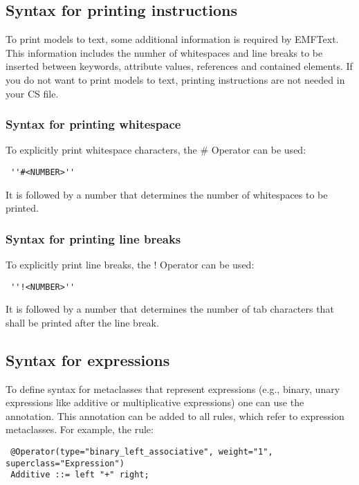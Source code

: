 \subsection{Syntax for printing instructions}

To print models to text, some additional information is required by EMFText. This information includes the numher of whitespaces and line breaks to be inserted between keywords, attribute values, references and contained elements. If you do not want to print models to text, printing instructions are not needed in your CS file.

\subsubsection{Syntax for printing whitespace}

To explicitly print whitespace characters, the \# Operator can be used:

\begin{lstlisting}
 ''#<NUMBER>''
\end{lstlisting}

It is followed by a number that determines the number of whitespaces to be printed.

\subsubsection{Syntax for printing line breaks}

To explicitly print line breaks, the ! Operator can be used:

\begin{lstlisting}
 ''!<NUMBER>''
\end{lstlisting}

It is followed by a number that determines the number of tab characters that shall be printed after the line break.

\subsection{Syntax for expressions}

To define syntax for metaclasses that represent expressions (e.g., binary, unary
expressions like additive or multiplicative expressions) one can use the
\@Operator annotation. This annotation can be added to all rules, which refer to 
expression metaclasses. For example, the rule:

\begin{lstlisting}
 @Operator(type="binary_left_associative", weight="1", superclass="Expression")
 Additive ::= left "+" right;
\end{lstlisting}

